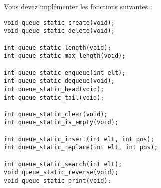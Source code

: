 
\noindent Vous devez implémenter les fonctions suivantes :

\bigskip

\lstset{language=C}
\begin{lstlisting}[frame=single,title={Liste des fonctions pour une file avec liste chaînée}]
void queue_static_create(void);
void queue_static_delete(void);

int queue_static_length(void);
int queue_static_max_length(void);

int queue_static_enqueue(int elt);
int queue_static_dequeue(void);
int queue_static_head(void);
int queue_static_tail(void);

int queue_static_clear(void);
int queue_static_is_empty(void);

int queue_static_insert(int elt, int pos);
int queue_static_replace(int elt, int pos);

int queue_static_search(int elt);
void queue_static_reverse(void);
void queue_static_print(void);
\end{lstlisting}


